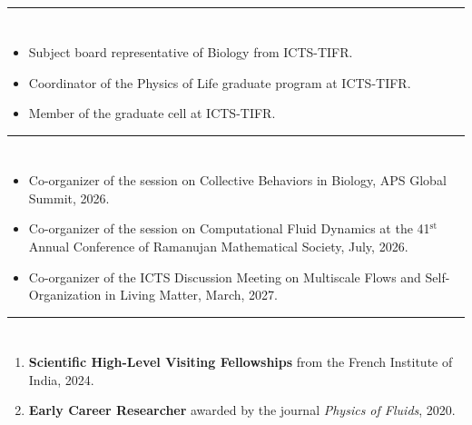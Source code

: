 \documentclass[10pt]{res} %
\begin{document}
\begin{resume}
\noindent\rule{\textwidth}{0.6pt}
\vspace*{-10mm}
\section{}
\begin{itemize}
	\vspace*{5mm}
	\item Subject board representative of Biology from ICTS-TIFR. 
	\item Coordinator of the Physics of Life graduate program at ICTS-TIFR. 
	\item Member of the graduate cell at ICTS-TIFR. 
\end{itemize}


\noindent\rule{\textwidth}{0.6pt}
\vspace*{-10mm}
\section{}
\begin{itemize}
	\vspace*{5mm}
	\item Co-organizer of the session on Collective Behaviors in Biology, APS Global Summit, 2026. 
	\item Co-organizer of the session on Computational Fluid Dynamics at the 41$^\mathrm{st}$ Annual Conference of Ramanujan Mathematical Society, July, 2026.
	\item Co-organizer of the ICTS Discussion Meeting on Multiscale Flows and Self-Organization in Living Matter, March, 2027.
\end{itemize}


\vspace*{-2mm}
\noindent\rule{\textwidth}{0.6pt}
\vspace*{-10mm}
\section{}
\begin{enumerate}
	\item \textbf{Scientific High-Level Visiting Fellowships} from the French Institute of India, 2024.
	
	\item \textbf{Early Career Researcher} awarded by the journal \textit{Physics of Fluids}, 2020.
	

\end{enumerate}
\end{resume}
\end{document}

